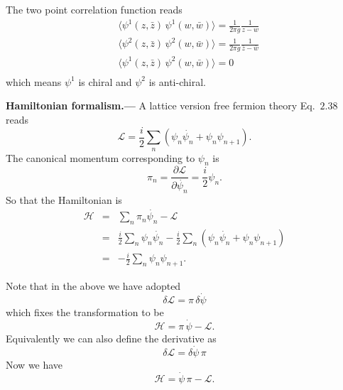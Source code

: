 \documentclass[submission, PhysLectNotes]{SciPost}
\begin{document}
The two point correlation function reads 
\begin{equation}
	\begin{aligned}
		&\langle \psi^1(z,\bar{z}) \, \psi^1(w,\bar{w}) \rangle = \frac{1}{2\pi g} \frac{1}{z-w} \\
		&\langle \psi^2(z,\bar{z}) \, \psi^2(w,\bar{w}) \rangle = \frac{1}{2\pi g} \frac{1}{\bar{z}-\bar{w}} \\
		&\langle \psi^1(z,\bar{z}) \, \psi^2(w,\bar{w}) \rangle = 0\\
	\end{aligned}
\end{equation} 
which means $\psi^1$ is chiral and $\psi^2$ is anti-chiral.

{\bf Hamiltonian formalism.---}
A lattice version free fermion theory Eq.~$2.38$ reads
\begin{equation}
    \mathcal{L} = \frac{i}{2} \sum_n \left( \psi_n \dot{\psi_n} + \psi_n \psi_{n+1}\right).
\end{equation}
The canonical momentum corresponding to $\psi_n$ is
\begin{equation}
    \pi_n = \frac{\partial \mathcal{L}}{\partial \dot{\psi_n}} = \frac{i}{2}\psi_n.
\end{equation}
So that the Hamiltonian is
\begin{eqnarray}
    \mathcal{H} &=& \sum_n \pi_n \dot{\psi_n} - \mathcal{L} \nonumber\\
      &=& \frac{i}{2}\sum_n\psi_n \dot{\psi_n} - \frac{i}{2} \sum_n \left( \psi_n \dot{\psi_n} + \psi_n \psi_{n+1}\right) \\
      &=& - \frac{i}{2} \sum_n \psi_n \psi_{n+1} \nonumber.
\end{eqnarray}

Note that in the above we have adopted
\begin{equation}
	\delta \mathcal{L} = \pi\,\delta \dot{\psi}
\end{equation}
which fixes the transformation to be 
\begin{equation}
	\mathcal{H} = \pi \,\dot{\psi} - \mathcal{L}.
\end{equation}
Equivalently we can also define the derivative as
\begin{equation}
	\delta \mathcal{L} = \delta \dot{\psi} \,\pi
\end{equation}
Now we have 
\begin{equation}
	\mathcal{H} = \dot{\psi} \, \pi - \mathcal{L}.
\end{equation}
\end{document}
